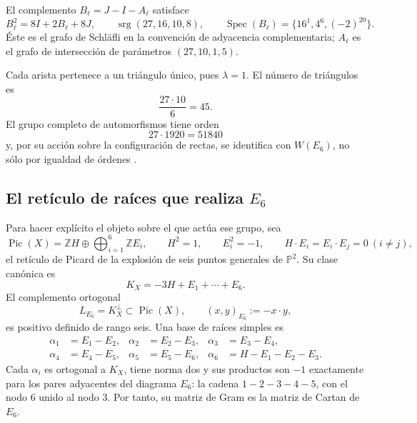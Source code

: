 El complemento \(B_\ell=J-I-A_\ell\) satisface
\begin{equation}
 B_\ell^2=8I+2B_\ell+8J,
 \qquad
 \operatorname{srg}(27,16,10,8),
 \qquad
 \operatorname{Spec}(B_\ell)=\{16^1,4^6,(-2)^{20}\}.
 \label{p12-83-c20-s6:eq:complemento-schlafli}
\end{equation}
Éste es el grafo de Schläfli en la convención de adyacencia complementaria;
\(A_\ell\) es el grafo de intersección de parámetros
\((27,10,1,5)\).

Cada arista pertenece a un triángulo único, pues \(\lambda=1\). El número
de triángulos es
\[
 \frac{27\cdot10}{6}=45.
\]
El grupo completo de automorfismos tiene orden
\[
 27\cdot1920=51840
\]
y, por su acción sobre la configuración de rectas, se identifica con
\(W(E_6)\), no sólo por igualdad de órdenes \cite{Manivel2005}.

\subsection{El retículo de raíces que realiza \texorpdfstring{\(E_6\)}{E6}}

Para hacer explícito el objeto sobre el que actúa ese grupo, sea
\begin{equation}
 \operatorname{Pic}(X)
 =\mathbb ZH\oplus\bigoplus_{i=1}^6\mathbb ZE_i,
 \qquad
 H^2=1,\qquad E_i^2=-1,\qquad H\cdot E_i=E_i\cdot E_j=0\ (i\ne j),
 \label{p12-83-c20-s6:eq:picard-cubica-e6}
\end{equation}
el retículo de Picard de la explosión de seis puntos generales de
\(\mathbb P^2\). Su clase canónica es
\[
 K_X=-3H+E_1+\cdots+E_6.
\]
El complemento ortogonal
\begin{equation}
 L_{E_6}=K_X^\perp\subset\operatorname{Pic}(X),
 \qquad (x,y)_{E_6}:=-x\cdot y,
 \label{p12-83-c20-s6:eq:reticulo-raices-e6}
\end{equation}
es positivo definido de rango seis. Una base de raíces simples es
\begin{equation}
 \begin{aligned}
 \alpha_1&=E_1-E_2,& \alpha_2&=E_2-E_3,&
 \alpha_3&=E_3-E_4,\\
 \alpha_4&=E_4-E_5,& \alpha_5&=E_5-E_6,&
 \alpha_6&=H-E_1-E_2-E_3.
 \end{aligned}
 \label{p12-83-c20-s6:eq:raices-simples-e6}
\end{equation}
Cada \(\alpha_i\) es ortogonal a \(K_X\), tiene norma dos y sus productos
son \(-1\) exactamente para los pares adyacentes del diagrama
\(E_6\): la cadena \(1-2-3-4-5\), con el nodo \(6\) unido al nodo \(3\).
Por tanto, su matriz de Gram es la matriz de Cartan de \(E_6\).

